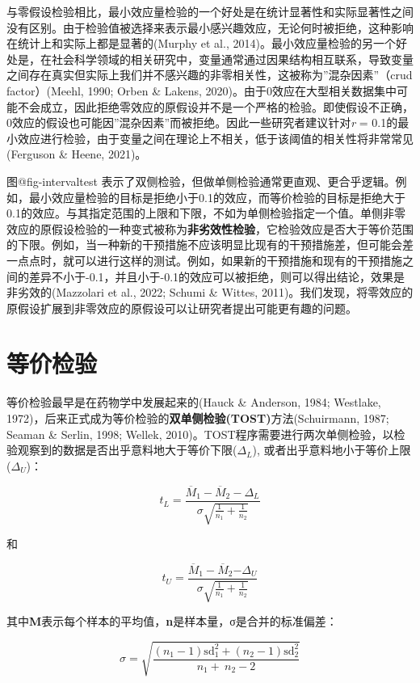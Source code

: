 \documentclass[
  letterpaper,
  DIV=11,
  numbers=noendperiod]{scrreprt}
\begin{document}
与零假设检验相比，最小效应量检验的一个好处是在统计显著性和实际显著性之间没有区别。由于检验值被选择来表示最小感兴趣效应，无论何时被拒绝，这种影响在统计上和实际上都是显著的(Murphy
et al.,
2014)。最小效应量检验的另一个好处是，在社会科学领域的相关研究中，变量通常通过因果结构相互联系，导致变量之间存在真实但实际上我们并不感兴趣的非零相关性，这被称为''混杂因素''（crud
factor）(Meehl, 1990; Orben \& Lakens,
2020)。由于0效应在大型相关数据集中可能不会成立，因此拒绝零效应的原假设并不是一个严格的检验。即使假设不正确，0效应的假设也可能因''混杂因素''而被拒绝。因此一些研究者建议针对\emph{r}
=
0.1的最小效应进行检验，由于变量之间在理论上不相关，低于该阈值的相关性将非常常见(Ferguson
\& Heene, 2021)。

图@fig-intervaltest
表示了双侧检验，但做单侧检验通常更直观、更合乎逻辑。例如，最小效应量检验的目标是拒绝小于0.1的效应，而等价检验的目标是拒绝大于0.1的效应。与其指定范围的上限和下限，不如为单侧检验指定一个值。单侧非零效应的原假设检验的一种变式被称为\textbf{非劣效性检验}，它检验效应是否大于等价范围的下限。例如，当一种新的干预措施不应该明显比现有的干预措施差，但可能会差一点点时，就可以进行这样的测试。例如，如果新的干预措施和现有的干预措施之间的差异不小于-0.1，并且小于-0.1的效应可以被拒绝，则可以得出结论，效果是非劣效的(Mazzolari
et al., 2022; Schumi \& Wittes,
2011)。我们发现，将零效应的原假设扩展到非零效应的原假设可以让研究者提出可能更有趣的问题。

\hypertarget{ux7b49ux4ef7ux68c0ux9a8c}{%
\section{等价检验}\label{ux7b49ux4ef7ux68c0ux9a8c}}

等价检验最早是在药物学中发展起来的(Hauck \& Anderson, 1984; Westlake,
1972)，后来正式成为等价检验的\textbf{双单侧检验(TOST)}方法(Schuirmann,
1987; Seaman \& Serlin, 1998; Wellek,
2010)。TOST程序需要进行两次单侧检验，以检验观察到的数据是否出乎意料地大于等价下限(\(\Delta_{L}\)),
或者出乎意料地小于等价上限(\(\Delta_{U}\))：

\[
t_{L} = \frac{{\overline{M}}_{1} - {\overline{M}}_{2} - \Delta_{L}}{\sigma\sqrt{\frac{1}{n_{1}} + \frac{1}{n_{2}}}}
\]

和

\[
t_{U} = \frac{{\overline{M}}_{1} - {\overline{M}}_{2}{- \Delta}_{U}}{\sigma\sqrt{\frac{1}{n_{1}} + \frac{1}{n_{2}}}}
\]

其中\textbf{M}表示每个样本的平均值，\textbf{n}是样本量，σ是合并的标准偏差：

\[
\sigma = \sqrt{\frac{\left( n_{1} - 1 \right)\text{sd}_{1}^{2} + \left( n_{2} - 1 \right)\text{sd}_{2}^{2}}{n_{1} + \ n_{2} - 2}}
\]
\end{document}
